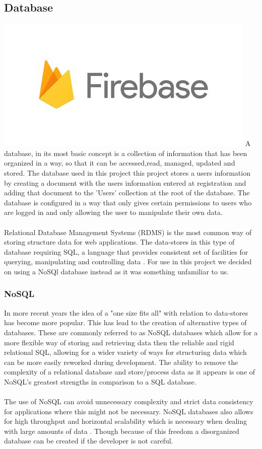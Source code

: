 \subsection{Database}
\includegraphics[scale=0.15]{./img/Firebase.jpg}
A database, in its most basic concept is a collection of information that has been organized in a way, so that it can be accessed,read, managed, updated and stored. The database used in this project this project stores a users information by creating a document with the users information entered at registration and adding that document to the 'Users' collection at the root of the database. The database is configured in a way that only gives certain permissions to users who are logged in and only allowing the user to manipulate their own data.\\\\
Relational Database Management Systems (RDMS) is the most common way of storing structure data for web applications.  The data-stores in this type of database requiring SQL, a language that provides consistent set of facilities for querying, manipulating and controlling data \cite{strauch2011nosql}. For use in this project we decided on using a NoSQl database instead as it was something unfamiliar to us.

\subsubsection{NoSQL}
In more recent years the idea of a "one size fits all" with relation to data-stores has become more popular. This has lead to the creation of alternative types of databases.  These are commonly referred to as NoSQL databases which allow for a more flexible way of storing and retrieving data then the reliable and rigid relational SQL, allowing for a wider variety of ways for structuring data which can be more easily reworked during development.  The ability to remove the complexity of a relational database and store/process data as it appears is one of NoSQL's greatest strengths in comparison to a SQL database. \\\\
The use of NoSQL can avoid unnecessary complexity and strict data consistency for applications where this might not be necessary.  NoSQL databases also allows for high throughput and horizontal scalability which is necessary when dealing with large amounts of data \cite{strauch2011nosql}. Though because of this freedom a disorganized database can be created if the developer is not careful.

